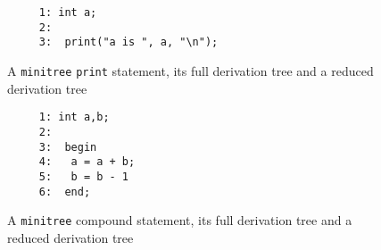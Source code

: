 \begin{figure}
\hspace*{3cm}
\begin{minipage}{10cm}
\begin{verbatim}
     1: int a;
     2: 
     3:  print("a is ", a, "\n");
\end{verbatim}
\end{minipage}

\vspace*{1cm}

\hspace*{2cm}
\begin{minipage}{10cm}
\end{minipage}

\vspace*{1cm}

\hspace*{5cm}
\begin{minipage}{10cm}
\end{minipage}

\caption{A {\tt minitree} {\tt print} statement, its full derivation tree and a reduced derivation tree}
\label{tree:prn}
\end{figure}

\begin{figure}
\hspace*{3cm}
\begin{minipage}{10cm}
\begin{verbatim}
     1: int a,b;
     2: 
     3:  begin 
     4:   a = a + b;
     5:   b = b - 1
     6:  end;
\end{verbatim}
\end{minipage}

\vspace*{1cm}

\hspace*{2cm}
\begin{minipage}{10cm}
\end{minipage}

\vspace*{1cm}

\hspace*{5cm}
\begin{minipage}{10cm}
\end{minipage}

\caption{A {\tt minitree} compound statement, its full derivation tree and a reduced derivation tree}
\label{tree:cmp}
\end{figure}

